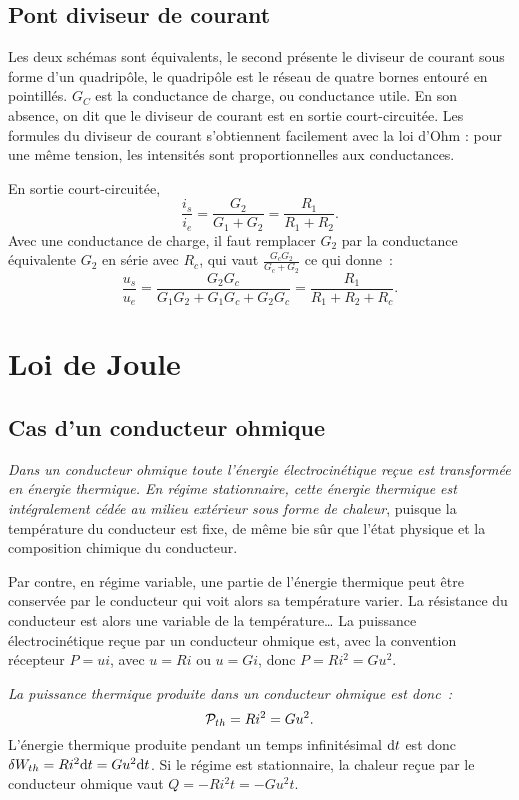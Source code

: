 \subsection{Pont diviseur de courant}
Les deux schémas sont équivalents, le second présente le diviseur de courant sous forme d'un quadripôle, le quadripôle est le réseau de quatre bornes entouré en pointillés. $G_C$ est la conductance de charge, ou conductance utile. En son absence, on dit que le diviseur de courant est en sortie court-circuitée. Les formules du diviseur de courant s'obtiennent facilement avec la loi d'Ohm : pour une même tension, les intensités sont proportionnelles aux conductances.

En sortie court-circuitée,
\begin{equation}\label{eq:pontdiviseuri}
\frac{i_s}{i_e} = \frac{G_2}{G_1+G_2} = \frac{R_1}{R_1+R_2}.
\end{equation}
Avec une conductance de charge, il faut remplacer $G_2$ par la conductance équivalente $G_2$ en série avec $R_c$, qui vaut $\frac{G_cG_2}{G_c+G_2}$ ce qui donne~:
\begin{equation}\label{eq:diviseuri_gc}
\frac{u_s}{u_e} = \frac{G_2G_c}{G_1G_2+G_1G_c+G_2G_c} = \frac{R_1}{R_1+R_2+R_c}.
\end{equation}

\section{Loi de Joule}
\subsection{Cas d'un conducteur ohmique}

\emph{Dans un conducteur ohmique toute l'énergie électrocinétique reçue est transformée en énergie thermique. En régime stationnaire, cette énergie thermique est intégralement cédée au milieu extérieur sous forme de chaleur}, puisque la température du conducteur est fixe, de même bie sûr que l'état physique et la composition chimique du conducteur.

Par contre, en régime variable, une partie de l'énergie thermique peut être conservée par le conducteur qui voit alors sa température varier. La résistance du conducteur est alors une variable de la température\ldots{} La puissance électrocinétique reçue par un conducteur ohmique est, avec la convention récepteur $P = ui$, avec $u=Ri$ ou $u=Gi$, donc $P=R i^2 = G u^2$.

\emph{La puissance thermique produite dans un conducteur ohmique est donc~:}
\begin{equation}\label{eq:loidejoule}
	\P_{th} = Ri^2=Gu^2.
\end{equation}
L'énergie thermique produite pendant un temps infinitésimal $\D t$ est donc $\delta W_{th} = Ri^2 \D t = Gu^2 \D t$. Si le régime est stationnaire, la chaleur reçue par le conducteur ohmique vaut $Q = -Ri^2 t = -Gu^2 t$.

